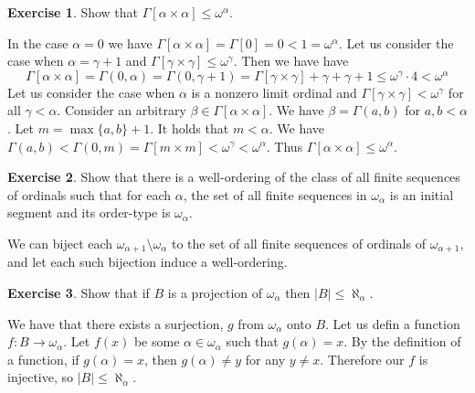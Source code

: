 \documentclass{article}
\theoremstyle{definition}
\newtheorem{exer}{Exercise}[section]
\newcommand{\abs}[1]{\lvert#1\rvert}
\newlength{\defparindent}
\newenvironment{answer}
    {\begin{mdframed}[backgroundcolor=gray!15, linewidth=0pt] \setlength{\parindent}{\defparindent}}
    {\end{mdframed}}
\begin{document}
\begin{exer}
    Show that $\Gamma[\alpha \times \alpha] \le \omega^\alpha$.
    \begin{answer}
        In the case $\alpha = 0$ we have $\Gamma[\alpha \times \alpha] = \Gamma[0] = 0 < 1 = \omega^\alpha$. Let us consider the case when $\alpha = \gamma + 1$ and $\Gamma[\gamma \times \gamma] \le \omega^\gamma$. Then we have have 
        \[
            \Gamma[\alpha \times \alpha] 
            = 
            \Gamma(0, \alpha) = \Gamma(0, \gamma + 1) 
            =
            \Gamma[\gamma \times \gamma] + \gamma + \gamma + 1
            \le 
            \omega^\gamma \cdot 4 
            <
            \omega^\alpha
        \]
        Let us consider the case when $\alpha$ is a nonzero limit ordinal and $\Gamma[\gamma \times \gamma] < \omega^\gamma$ for all $\gamma < \alpha$. Consider an arbitrary $\beta \in \Gamma[\alpha \times \alpha]$. We have $\beta = \Gamma(a, b)$ for $a, b < \alpha$. Let $m = \max\{a, b\} + 1$. It holds that $m < \alpha$. We have $\Gamma(a, b) < \Gamma(0, m) = \Gamma[m \times m] < \omega^\gamma < \omega^\alpha$. Thus $\Gamma[\alpha \times \alpha] \le \omega^\alpha$.
    \end{answer}
\end{exer}

\begin{exer}
    Show that there is a well-ordering of the class of all finite sequences of ordinals such that for each $\alpha$, the set of all finite sequences in $\omega_\alpha$ is an initial segment and its order-type is $\omega_\alpha$.
    \begin{answer}
        We can biject each $\omega_{\alpha + 1} \setminus \omega_{\alpha}$ to the set of all finite sequences of ordinals of $\omega_{\alpha + 1}$, and let each such bijection induce a well-ordering.
    \end{answer}
\end{exer}

\begin{exer}
    Show that if $B$ is a projection of $\omega_\alpha$ then $\abs{B} \le \aleph_\alpha$.
    \begin{answer}
        We have that there exists a surjection, $g$ from $\omega_\alpha$ onto $B$. Let us defin a function $f: B \to \omega_\alpha$. Let $f(x)$ be some $\alpha \in \omega_\alpha$ such that $g(\alpha) = x$. By the definition of a function, if $g(\alpha) = x$, then $g(\alpha) \ne y$ for any $y \ne x$. Therefore our $f$ is injective, so $\abs{B} \le \aleph_\alpha$.
    \end{answer}
\end{exer}
\end{document}
